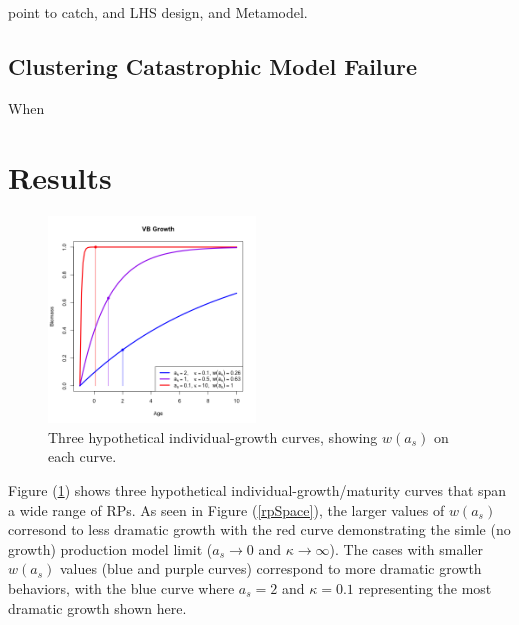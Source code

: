 %
{\color{red}
point to catch, and LHS design, and Metamodel.
}

%
\subsection{Clustering Catastrophic Model Failure}

%
When 

%
%

%
%

%
\section{Results}

\begin{figure}
\vspace{-1.5cm}
\includegraphics[width=0.49\textwidth]{../ddBias/vbCurves.png}
\vspace{-1cm}
\caption{Three hypothetical individual-growth curves, showing $w(a_s)$ on each curve.}\label{vbCurves}
\end{figure}
%
Figure (\ref{vbCurves}) shows three hypothetical individual-growth/maturity curves 
that span a wide range of RPs. As seen in Figure (\ref{rpSpace}), the larger values of 
$w(a_s)$ corresond to less dramatic growth with the red curve demonstrating the 
simle (no growth) production model limit ($a_s\rightarrow0$ and $\kappa\rightarrow\infty$). 
The cases with smaller $w(a_s)$ values (blue and purple curves) correspond to more dramatic 
growth behaviors, with the blue curve where $a_s=2$ and $\kappa=0.1$ representing the most 
dramatic growth shown here.

